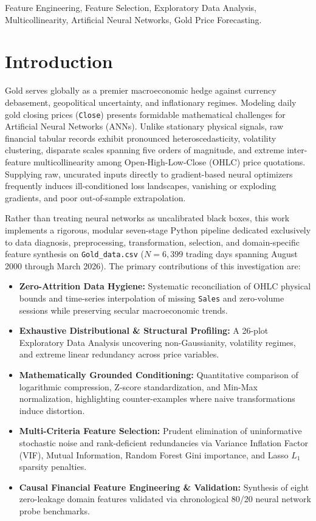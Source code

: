 \documentclass[conference]{IEEEtran}
\begin{document}
\begin{IEEEkeywords}
Feature Engineering, Feature Selection, Exploratory Data Analysis, Multicollinearity, Artificial Neural Networks, Gold Price Forecasting.
\end{IEEEkeywords}

\section{Introduction}
\label{sec:introduction}

Gold serves globally as a premier macroeconomic hedge against currency debasement, geopolitical uncertainty, and inflationary regimes. Modeling daily gold closing prices (\texttt{Close}) presents formidable mathematical challenges for Artificial Neural Networks (ANNs). Unlike stationary physical signals, raw financial tabular records exhibit pronounced heteroscedasticity, volatility clustering, disparate scales spanning five orders of magnitude, and extreme inter-feature multicollinearity among Open-High-Low-Close (OHLC) price quotations. Supplying raw, uncurated inputs directly to gradient-based neural optimizers frequently induces ill-conditioned loss landscapes, vanishing or exploding gradients, and poor out-of-sample extrapolation.

Rather than treating neural networks as uncalibrated black boxes, this work implements a rigorous, modular seven-stage Python pipeline dedicated exclusively to data diagnosis, preprocessing, transformation, selection, and domain-specific feature synthesis on \texttt{Gold\_data.csv} ($N = 6{,}399$ trading days spanning August 2000 through March 2026). The primary contributions of this investigation are:
\begin{itemize}
    \item \textbf{Zero-Attrition Data Hygiene:} Systematic reconciliation of OHLC physical bounds and time-series interpolation of missing \texttt{Sales} and zero-volume sessions while preserving secular macroeconomic trends.
    \item \textbf{Exhaustive Distributional \& Structural Profiling:} A 26-plot Exploratory Data Analysis uncovering non-Gaussianity, volatility regimes, and extreme linear redundancy across price variables.
    \item \textbf{Mathematically Grounded Conditioning:} Quantitative comparison of logarithmic compression, Z-score standardization, and Min-Max normalization, highlighting counter-examples where naive transformations induce distortion.
    \item \textbf{Multi-Criteria Feature Selection:} Prudent elimination of uninformative stochastic noise and rank-deficient redundancies via Variance Inflation Factor (VIF), Mutual Information, Random Forest Gini importance, and Lasso $L_1$ sparsity penalties.
    \item \textbf{Causal Financial Feature Engineering \& Validation:} Synthesis of eight zero-leakage domain features validated via chronological 80/20 neural network probe benchmarks.
\end{itemize}
\end{document}
